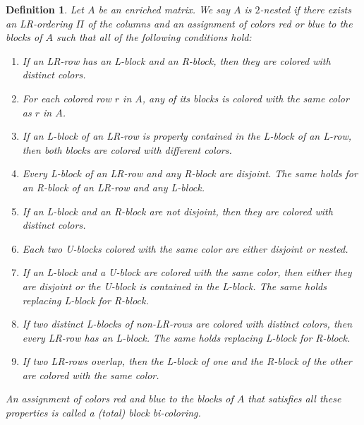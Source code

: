 \documentclass[12pt]{book}
\theoremstyle{plain}
\newtheorem{defn}[teo]{Definition}
\theoremstyle{remark}
\begin{document}
\begin{defn} \label{def:2-nested}
	Let $A$ be an enriched matrix. We say $A$ is \emph{$2$-nested} if there exists an LR-ordering $\Pi$ of the columns and an assignment of colors red or blue to the blocks of $A$ such that all of the following conditions hold:
\begin{enumerate}
	\item If an LR-row has an L-block and an R-block, then they are colored with distinct colors. \label{item:2nested1}
	\item For each colored row $r$ in $A$, any of its blocks is colored with the same color as $r$ in $A$. \label{item:2nested2}
	\item If an L-block of an LR-row is properly contained in the L-block of an L-row, then both blocks are colored with different colors. \label{item:2nested3}
	\item Every L-block of an LR-row and any R-block are disjoint. The same holds for an R-block of an LR-row and any L-block. \label{item:2nested4} %
	\item If an L-block and an R-block are not disjoint, then they are colored with distinct colors.	\label{item:2nested5} %
	\item Each two U-blocks colored with the same color are either disjoint or nested. \label{item:2nested6}
	\item If an L-block and a U-block are colored with the same color, then either they are disjoint or the U-block is contained in the L-block. The same holds replacing L-block for R-block. \label{item:2nested7}
	\item If two distinct L-blocks of non-LR-rows are colored with distinct colors, then every LR-row has an L-block. The same holds replacing L-block for R-block.  \label{item:2nested8} %
	\item If two LR-rows overlap, then the L-block of one and the R-block of the other are colored with the same color. \label{item:2nested9}
	
\end{enumerate}	

An assignment of colors red and blue to the blocks of $A$ that satisfies all these properties is called a \emph{(total) block bi-coloring}.
\end{defn} 
\end{document}
